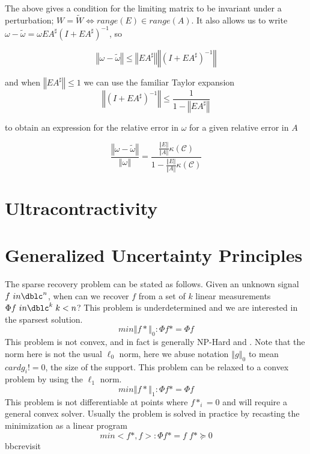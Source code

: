 \documentclass[a4paper]{article}
\newcommand{\norm}[1]{\left\Vert#1\right\Vert}
\theoremstyle{plain}
\theoremstyle{definition}
\theoremstyle{remark}
\numberwithin{equation}{section}
\begin{document}
The above gives a condition for the limiting matrix to be invariant under a perturbation;  $W=\tilde{W} \iff range(E) \in range(A)$.  It also allows us to write $\omega - \tilde{\omega} = \omega E A^\sharp (I+ E A^\sharp)^{-1}$, so

\begin{equation*}
\norm{\omega - \tilde{\omega}} \leq \norm{E A^\sharp} \norm{ (I+E A^\sharp)^{-1}}
\end{equation*}

and when $\norm{E A^\sharp} \leq 1$ we can use the familiar Taylor expansion
\begin{equation*}
\norm{(I+E A^\sharp)^{-1}} \leq \frac{1}{ 1 - \norm{E A^\sharp } }
\end{equation*}

to obtain an expression for the relative error in $\omega$ for a given relative error in $A$

\begin{equation*}
\frac{\norm{\omega - \tilde{\omega}}}{\norm{\omega}} = \frac{ \frac{\norm{E}}{\norm{A}} \kappa(\mathcal{C}) } {1 - \frac{\norm{E}}{\norm{A}} \kappa(\mathcal{C}) }
\end{equation*}



\section{Ultracontractivity}


\section{Generalized Uncertainty Principles}
The sparse recovery problem can be stated as follows.  Given an unknown signal $f \ in \dblc^n$, when can we recover $f$ from a set of $k$ linear measurements $\Phi f \ in \dblc^k \; k<n$? This problem is underdetermined and we are interested in the sparsest solution.
\begin{equation*}
min \norm{f*}_0 : \Phi f* = \Phi f
\end{equation*}
This problem is not convex, and in fact is generally NP-Hard \cite{Donoho04formost} and \cite{natarajan1995sparse}.  Note that the norm here is not the usual $\ell_0$ norm, here we abuse notation $\norm{g}_0$ to mean $card{g_i ! = 0}$, the size of the support. This problem can be relaxed to a convex problem by using the $\ell_1$ norm.
\begin{equation*}
min \norm{f*}_1 : \Phi f* = \Phi f
\end{equation*}
This problem is not differentiable at points where $f*_i=0$ and will require a general convex solver.  Usually the problem is solved in practice by recasting the minimization as a linear program
\begin{equation*}
min <f*,f> : \Phi f* = f \;  f* \succeq 0
\end{equation*}
bbcrevisit
\end{document}
